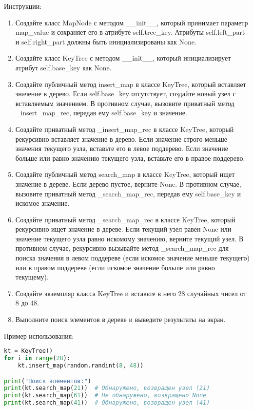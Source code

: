 \begin{enumerate}
Инструкции:
\begin{enumerate}
    \item Создайте класс MapNode с методом \_\_init\_\_, который принимает параметр map\_value и сохраняет его в атрибуте self.tree\_key. Атрибуты self.left\_part и self.right\_part должны быть инициализированы как None.
    \item Создайте класс KeyTree с методом \_\_init\_\_, который инициализирует атрибут self.base\_key как None.
    \item Создайте публичный метод insert\_map в классе KeyTree, который вставляет значение в дерево. Если self.base\_key отсутствует, создайте новый узел с вставляемым значением. В противном случае, вызовите приватный метод \_insert\_map\_rec, передав ему self.base\_key и значение.
    \item Создайте приватный метод \_insert\_map\_rec в классе KeyTree, который рекурсивно вставляет значение в дерево. Если значение строго меньше значения текущего узла, вставьте его в левое поддерево. Если значение больше или равно значению текущего узла, вставьте его в правое поддерево.
    \item Создайте публичный метод search\_map в классе KeyTree, который ищет значение в дереве. Если дерево пустое, верните None. В противном случае, вызовите приватный метод \_search\_map\_rec, передав ему self.base\_key и искомое значение.
    \item Создайте приватный метод \_search\_map\_rec в классе KeyTree, который рекурсивно ищет значение в дереве. Если текущий узел равен None или значение текущего узла равно искомому значению, верните текущий узел. В противном случае, рекурсивно вызывайте метод \_search\_map\_rec для поиска значения в левом поддереве (если искомое значение меньше текущего) или в правом поддереве (если искомое значение больше или равно текущему).
    \item Создайте экземпляр класса KeyTree и вставьте в него 28 случайных чисел от 8 до 48.
    \item Выполните поиск элементов в дереве и выведите результаты на экран.
\end{enumerate}

Пример использования:
\begin{lstlisting}[language=Python]
kt = KeyTree()
for i in range(28):
    kt.insert_map(random.randint(8, 48))

print("Поиск элементов:")
print(kt.search_map(21))  # Обнаружено, возвращен узел (21)
print(kt.search_map(61))  # Не обнаружено, возвращено None
print(kt.search_map(41))  # Обнаружено, возвращен узел (41)
\end{lstlisting}


\end{enumerate}
